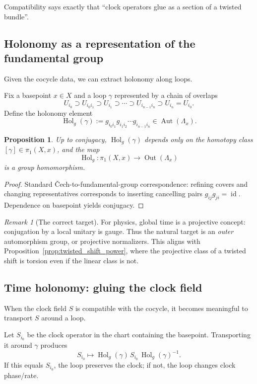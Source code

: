 \documentclass[11pt,oneside]{amsbook}
\numberwithin{equation}{section}
\theoremstyle{plain}
\newtheorem{proposition}[theorem]{Proposition}
\theoremstyle{definition}
\theoremstyle{remark}
\newtheorem{remark}[theorem]{Remark}
\DeclareMathOperator{\id}{\mathrm{id}}
\DeclareMathOperator{\Hol}{\mathrm{Hol}}
\DeclareMathOperator{\Aut}{\mathrm{Aut}}
\DeclareMathOperator{\Out}{\mathrm{Out}}
\begin{document}
Compatibility says exactly that ``clock operators glue as a section of a twisted bundle''.

\subsection{Holonomy as a representation of the fundamental group}
\label{sec:holonomy_rep}

Given the cocycle data, we can extract holonomy along loops.

Fix a basepoint $x\in X$ and a loop $\gamma$ represented by a chain of overlaps
\[
U_{i_0}\supset U_{i_0i_1}\supset U_{i_1}\supset \cdots \supset U_{i_{n-1}i_n}\supset U_{i_n}=U_{i_0}.
\]
Define the holonomy element
\[
\Hol_g(\gamma):=g_{i_0i_1}g_{i_1i_2}\cdots g_{i_{n-1}i_n}\in \Aut(\Lambda_{x}).
\]

\begin{proposition}
\label{prop:holonomy_rep}
Up to conjugacy, $\Hol_g(\gamma)$ depends only on the homotopy class $[\gamma]\in\pi_1(X,x)$, and the map
\[
\Hol_g:\pi_1(X,x)\to \Out(\Lambda_x)
\]
is a group homomorphism.
\end{proposition}

\begin{proof}
Standard \v{C}ech-to-fundamental-group correspondence: refining covers and changing representatives corresponds to inserting cancelling pairs $g_{ij}g_{ji}=\id$.
Dependence on basepoint yields conjugacy.
\end{proof}

\begin{remark}[The correct target]
For physics, global time is a projective concept: conjugation by a local unitary is gauge.
Thus the natural target is an \emph{outer} automorphism group, or projective normalizers.
This aligns with Proposition~\ref{prop:twisted_shift_power}, where the projective class of a twisted shift is torsion even if the linear class is not.
\end{remark}

\subsection{Time holonomy: gluing the clock field}
\label{sec:time_holonomy_gluing}

When the clock field $S$ is compatible with the cocycle, it becomes meaningful to transport $S$ around a loop.

Let $S_{i_0}$ be the clock operator in the chart containing the basepoint.
Transporting it around $\gamma$ produces
\[
S_{i_0}\longmapsto \Hol_g(\gamma)\, S_{i_0}\, \Hol_g(\gamma)^{-1}.
\]
If this equals $S_{i_0}$, the loop preserves the clock; if not, the loop changes clock phase/rate.
\end{document}
